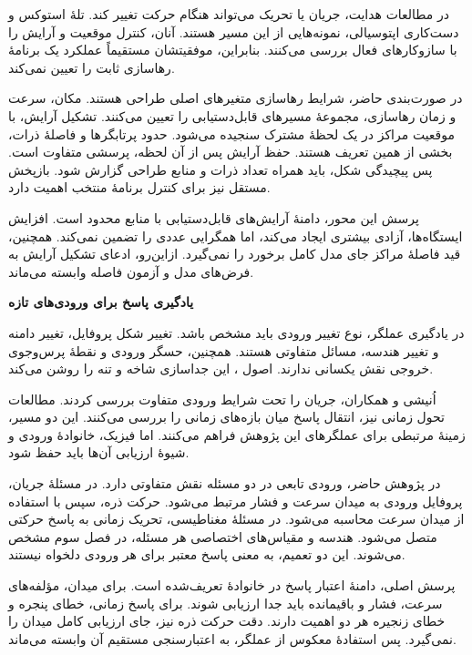 در مطالعات هدایت، جریان یا تحریک می‌تواند هنگام حرکت تغییر کند.
تلهٔ استوکس و دست‌کاری اپتوسیالی، نمونه‌هایی از این مسیر هستند.
آنان، کنترل موقعیت و آرایش را با سازوکارهای فعال بررسی می‌کنند.
بنابراین، موفقیتشان مستقیماً عملکرد یک برنامهٔ رهاسازی ثابت را تعیین نمی‌کند.
\cite{Shenoy2016StokesTrap,Erben2024Optofluidic}

در صورت‌بندی حاضر، شرایط رهاسازی متغیرهای اصلی طراحی هستند.
مکان، سرعت و زمان رهاسازی، مجموعهٔ مسیرهای قابل‌دستیابی را تعیین می‌کنند.
تشکیل آرایش، با موقعیت مراکز در یک لحظهٔ مشترک سنجیده می‌شود.
حدود پرتابگرها و فاصلهٔ ذرات، بخشی از همین تعریف هستند.
حفظ آرایش پس از آن لحظه، پرسشی متفاوت است.
پس پیچیدگی شکل، باید همراه تعداد ذرات و منابع طراحی گزارش شود.
بازپخش مستقل نیز برای کنترل برنامهٔ منتخب اهمیت دارد.

پرسش این محور، دامنهٔ آرایش‌های قابل‌دستیابی با منابع محدود است.
افزایش ایستگاه‌ها، آزادی بیشتری ایجاد می‌کند، اما همگرایی عددی را تضمین نمی‌کند.
همچنین، قید فاصلهٔ مراکز جای مدل کامل برخورد را نمی‌گیرد.
ازاین‌رو، ادعای تشکیل آرایش به فرض‌های مدل و آزمون فاصله وابسته می‌ماند.

\textbf{یادگیری پاسخ برای ورودی‌های تازه}

در یادگیری عملگر، نوع تغییر ورودی باید مشخص باشد.
تغییر شکل پروفایل، تغییر دامنه و تغییر هندسه، مسائل متفاوتی هستند.
همچنین، حسگر ورودی و نقطهٔ پرس‌وجوی خروجی نقش یکسانی ندارند.
اصول ، این جداسازی شاخه و تنه را روشن می‌کند.
\cite{lu2021deeponet}

اُنیشی و همکاران، جریان را تحت شرایط ورودی متفاوت بررسی کردند.
مطالعات تحول زمانی نیز، انتقال پاسخ میان بازه‌های زمانی را بررسی می‌کنند.
این دو مسیر، زمینهٔ مرتبطی برای عملگرهای این پژوهش فراهم می‌کنند.
اما فیزیک، خانوادهٔ ورودی و شیوهٔ ارزیابی آن‌ها باید حفظ شود.
\cite{Onishi2026FlowConditions,Wang2023LongTime}

در پژوهش حاضر، ورودی تابعی در دو مسئله نقش متفاوتی دارد.
در مسئلهٔ جریان، پروفایل ورودی به میدان سرعت و فشار مرتبط می‌شود.
حرکت ذره، سپس با استفاده از میدان سرعت محاسبه می‌شود.
در مسئلهٔ مغناطیسی، تحریک زمانی به پاسخ حرکتی متصل می‌شود.
هندسه و مقیاس‌های اختصاصی هر مسئله، در فصل سوم مشخص می‌شوند.
این دو تعمیم، به معنی پاسخ معتبر برای هر ورودی دلخواه نیستند.

پرسش اصلی، دامنهٔ اعتبار پاسخ در خانوادهٔ تعریف‌شده است.
برای میدان، مؤلفه‌های سرعت، فشار و باقیمانده باید جدا ارزیابی شوند.
برای پاسخ زمانی، خطای پنجره و خطای زنجیره هر دو اهمیت دارند.
دقت حرکت ذره نیز، جای ارزیابی کامل میدان را نمی‌گیرد.
پس استفادهٔ معکوس از عملگر، به اعتبارسنجی مستقیم آن وابسته می‌ماند.

